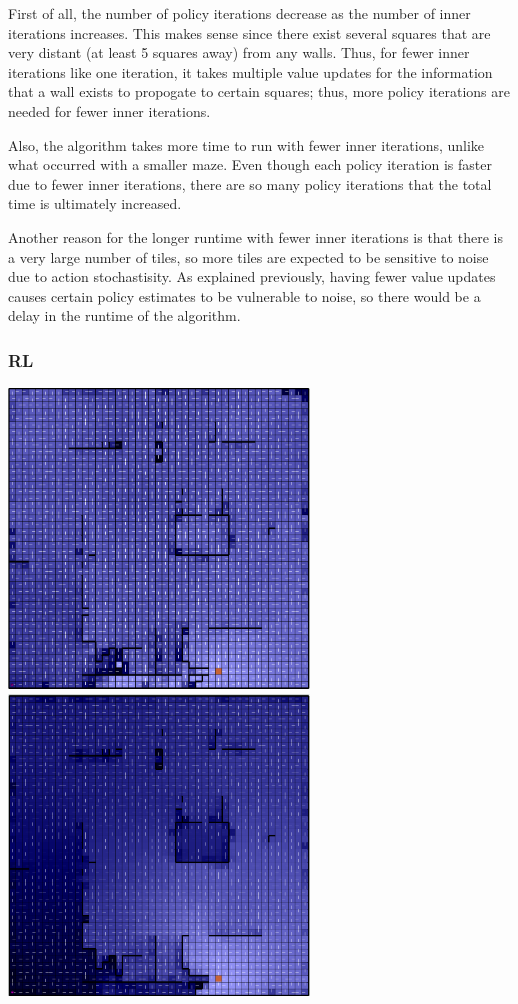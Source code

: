 \documentclass[11pt]{article}
\begin{document}
            First of all, the number of policy iterations decrease as the number of inner iterations
            increases. This makes sense since there exist several squares that are very distant
            (at least 5 squares away) from any walls. Thus, for fewer inner iterations like one iteration,
            it takes multiple value updates for the information that a wall exists to propogate to certain
            squares; thus, more policy iterations are needed for fewer inner iterations.

            Also, the algorithm takes more time to run with fewer inner iterations, unlike what
            occurred with a smaller maze. Even though each policy iteration is faster due to
            fewer inner iterations, there are so many policy iterations that the total time
            is ultimately increased.
            
            Another reason for the longer runtime with fewer inner iterations is that there is a very large number of
            tiles, so more tiles are expected to be sensitive to noise due to action
            stochastisity. As explained previously,
            having fewer value updates causes certain policy estimates to be vulnerable to noise,
            so there would be a delay in the runtime of the algorithm.

            \subsubsection{RL}

            \includegraphics[width=8cm]{../images/large/q_20.PNG}
            \includegraphics[width=8cm]{../images/large/q.PNG}
\end{document}
